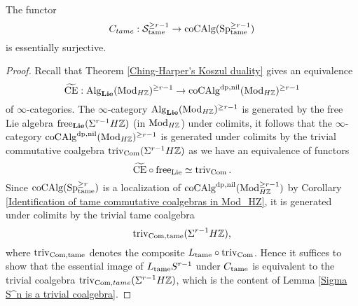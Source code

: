 \begin{lemma}
\label{Essential Surjectivity of C_tame}
	The functor 
	$$
	C_{tame}: \CS^{\geq r-1}_{\tame}  
	\to 
	\coCAlg(\Sp^{\geq r-1}_{\tame})
	$$
	is essentially surjective.
\end{lemma}
\begin{proof}
Recall that Theorem \ref{Ching-Harper's Koszul duality}
gives an equivalence
$$
\tildeCE: \Alg_{\spLie}(\Mod_{H\BZ})^{\geq r-1} \to \coCAlg^{\divpow, \nil}(\Mod_{H\BZ})^{\geq r-1}
$$
of $\infty$-categories. The $\infty$-category $\Alg_{\spLie}(\Mod_{H\BZ})^{\geq r-1}$ is generated by the free Lie algebra $\Free_{\spLie}(\Sigma^{r-1} H\BZ)$ (in $\Mod_{H\BZ}$) under colimits,
 it follows that the $\infty$-category $\coCAlg^{\divpow, \nil}(\Mod_{H\BZ})^{\geq r-1}$ is generated under colimits by the trivial commutative coalgebra $\trivial_{\Com}(\Sigma^{r-1}H \BZ)$ as we have an equivalence of functors
$$
\tildeCE \circ \Free_{\Lie} \simeq \trivial_{\Com}.
$$
Since $\coCAlg(\Sp^{\geq r}_{\tame})$ is
a localization of $\coCAlg^{\divpow, \nil}(\Mod_{H\BZ}^{\geq r-1})$ by Corollary \ref{Identification of tame commutative coalgebras in Mod_HZ},
it is generated under colimits by the trivial tame coalgebra 
$$
\trivial_{\Com,\tame}(\Sigma^{r-1}H \BZ),
$$ 
where $\trivial_{\Com,\tame}$ denotes the composite $L_{\tame}\circ \trivial_{\Com}$.
Hence it suffices to show that the essential image of $L_{\tame}S^{r-1}$ under $C_{\tame}$ is equivalent to the trivial coalgebra $\trivial_{\Com,tame}(\Sigma^{r-1}H \BZ)$, which is the content of Lemma \ref{Sigma S^n is a trivial coalgebra}.









\end{proof}
